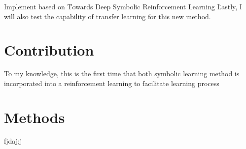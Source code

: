 \documentclass[12pt,twoside]{report}
\begin{document}
Implement based on \"Towards Deep Symbolic Reinforcement Learning \"

Lastly, I will also test the capability of transfer learning for this new method.

\section{Contribution}

To my knowledge, this is the first time that both symbolic learning method is incorporated into a reinforcement learning to facilitate learning process

\section{Methods}
fjdaj;j
\end{document}
